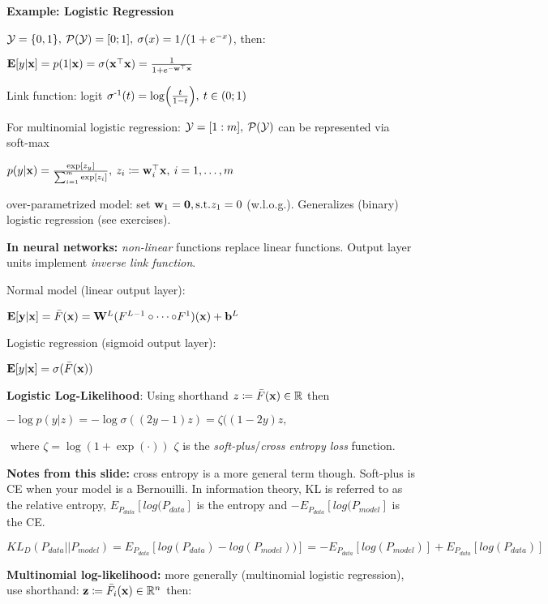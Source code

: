     \textbf{Example: Logistic Regression}
    
    $\mathcal{Y}=\{0,1\},\>\mathcal{P}(\mathcal{Y})=\lbrack0;1\rbrack,\>\sigma(x)=1/(1+e^{-x})$, then:
    
    \tab$\mathbf E{\lbrack}y|\mathbf x\rbrack=p(1|\mathbf x)=\sigma(\mathbf x^{\mathop{\mathrm{\top}}}\mathbf x)=\frac{1}{1+e^{-\mathbf w^{\mathop{\mathrm{\top}}}\mathbf x}}$
    
    Link function: logit $\sigma^{\text{-}1}(t)=\log(\frac{t}{1-t}),\>t\in(0;1)$
    
    For multinomial logistic regression: $\mathcal{Y}=\lbrack1:m\rbrack,\>\mathcal{P}(\mathcal{Y})$ can be represented via soft-max
    
    \tab$p(y|\mathbf x)=\frac{\exp\lbrack z_y\rbrack}{\sum_{i=1}^m\exp\lbrack z_i\rbrack},\>z_i\coloneqq\mathbf w_i^{\mathop{\mathrm{\top}}}\mathbf x,\>i=1,\ldots,m$
    
    over-parametrized model: set $\mathbf w_1=\mathbf{0}, \text{s.t.} z_1=0$ (w.l.o.g.). Generalizes (binary) logistic regression (see exercises).
    
    \textbf{In neural networks:} \emph{non-linear} functions replace linear functions. Output layer units implement \emph{inverse link function}.
    
    Normal model (linear output layer):
    
    \tab$\mathbf E\lbrack\mathbf y|\mathbf x\rbrack=\bar{F}(\mathbf x)=\mathbf W^L(F^{L-1}\circ\cdots{\circ}F^1)(\mathbf x)+\mathbf b^L$
    
    Logistic regression (sigmoid output layer):
    
    \tab$\mathbf E\lbrack y|\mathbf x\rbrack=\sigma(\bar{F}(\mathbf x))$
    
    \textbf{Logistic Log-Likelihood}: Using shorthand $z\coloneqq\bar{F}(\mathbf x)\in\mathbb R$ then
    
    \tab$-\log p(y|z)=-\log\sigma((2y-1)z)=\zeta((1-2y)z,$ 
    
    $\text{ where } \zeta=\log(1+\exp(\cdot))$
    $\zeta$ is the \emph{soft-plus}/\emph{cross entropy loss} function.
    
    \textbf{Notes from this slide:} cross entropy is a more general term though. Soft-plus is CE when your model is a Bernouilli. In information theory, KL is referred to as the relative entropy, $E_{P_{data}}[log(P_{data}]$ is the entropy and $-E_{P_{data}}[log(P_{model}]$ is the CE.
    
    $KL_D(P_{data} || P_{model}) = E_{P_{data}}[log(P_{data}) - log(P_{model}))] = - E_{P_{data}}[log(P_{model})] + E_{P_{data}}[log (P_{data})]$
    
    \textbf{Multinomial log-likelihood:} more generally (multinomial logistic regression), use shorthand: $\mathbf z \coloneqq\bar{F}_i(\mathbf x)\in\mathbb R^n $ then:
    
